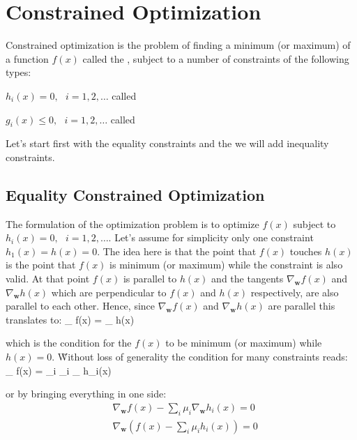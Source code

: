 \chapter{Constrained Optimization} \label{ch:constrained-optimization}

Constrained optimization is the problem of finding a minimum (or maximum) of a function $f(x)$ called the
, subject to a number of constraints of the following types:
\bit
\item $h_{i}(x) =0, \:\:\: i=1,2,\ldots$ called 
\item $g_{i}(x) \leq 0, \:\:\: i=1,2,\ldots$ called 
\eit

Let's start first with the equality constraints and the we will add inequality constraints.

\section{Equality Constrained Optimization}

The formulation of the optimization problem is to optimize $f(x)$ subject to $h_{i}(x) = 0, \:\:\: i=1,2,\ldots$.
Let's assume for simplicity only one constraint $h_{1}(x) = h(x) = 0$. The idea here is that the point that $f(x)$
touches $h(x)$ is the point that $f(x)$ is minimum (or maximum) while the constraint is also valid. At that point $f
(x)$ is parallel to $h(x)$ and the tangents $\nabla_{\boldsymbol{w}} f(x)$ and $\nabla_{\boldsymbol{w}} h(x)$ which
are perpendicular to $f(x)$ and $h(x)$ respectively, are also parallel to each other. Hence, since
$\nabla_{\boldsymbol{w}} f(x)$ and $\nabla_{\boldsymbol{w}} h(x)$ are parallel this translates to:
\bse
\nabla_{} f(x) = \mu \nabla_{} h(x)
\ese

\vspace{3pt}

which is the condition for the $f(x)$ to be minimum (or maximum) while $h(x) = 0$. \v

Without loss of generality the condition for many constraints reads:
\bse
\nabla_{} f(x) = \sum_{i} \mu_{i} \nabla_{} h_{i}(x)
\ese

or by bringing everything in one side:
\begin{align*}
& \nabla_{\boldsymbol{w}} f(x) - \sum_{i} \mu_{i} \nabla_{\boldsymbol{w}} h_{i}(x) = 0 \\
& \nabla_{\boldsymbol{w}} (f(x) - \sum_{i} \mu_{i} h_{i}(x)) = 0
\end{align*}

